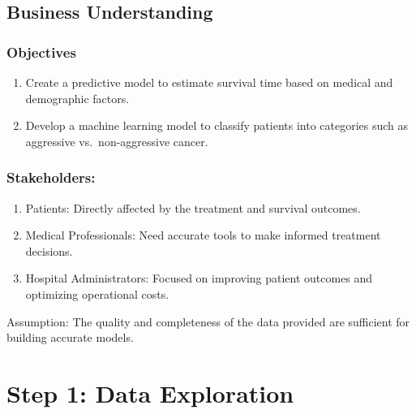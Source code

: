 \documentclass[11pt]{article}
\providecommand{\tightlist}{%
      \setlength{\itemsep}{0pt}\setlength{\parskip}{0pt}}
\begin{document}
\subsection{Business Understanding}\label{business-understanding}

\subsubsection{Objectives}\label{objectives}

\begin{enumerate}
\def\labelenumi{\arabic{enumi}.}
\tightlist
\item
  Create a predictive model to estimate survival time based on medical
  and demographic factors.
\item
  Develop a machine learning model to classify patients into categories
  such as aggressive vs.~non-aggressive cancer.
\end{enumerate}

\subsubsection{Stakeholders:}\label{stakeholders}

\begin{enumerate}
\def\labelenumi{\arabic{enumi}.}
\tightlist
\item
  Patients: Directly affected by the treatment and survival outcomes.
\item
  Medical Professionals: Need accurate tools to make informed treatment
  decisions.
\item
  Hospital Administrators: Focused on improving patient outcomes and
  optimizing operational costs.
\end{enumerate}

Assumption: The quality and completeness of the data provided are
sufficient for building accurate models.

    \section{Step 1: Data Exploration}\label{step-1-data-exploration}
\end{document}

